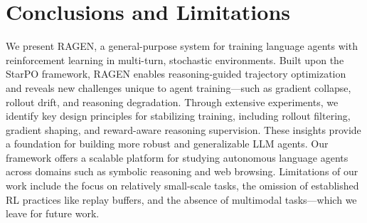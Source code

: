 \section{Conclusions and Limitations}
\label{sec:conclusions}
We present RAGEN, a general-purpose system for training language agents with reinforcement learning in multi-turn, stochastic environments. Built upon the StarPO framework, RAGEN enables reasoning-guided trajectory optimization and reveals new challenges unique to agent training—such as gradient collapse, rollout drift, and reasoning degradation. Through extensive experiments, we identify key design principles for stabilizing training, including rollout filtering, gradient shaping, and reward-aware reasoning supervision. These insights provide a foundation for building more robust and generalizable LLM agents. Our framework offers a scalable platform for studying autonomous language agents across domains such as symbolic reasoning and web browsing. Limitations of our work include the focus on relatively small-scale tasks, the omission of established RL practices like replay buffers, and the absence of multimodal tasks—which we leave for future work.




